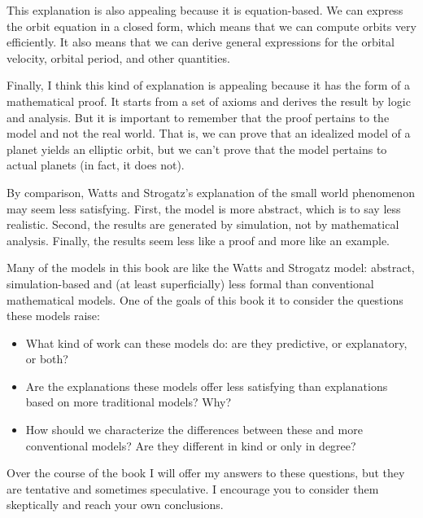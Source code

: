 \documentclass[10pt]{book}
\begin{document}
This explanation is also appealing because it is equation-based.
We can express the orbit equation in a closed form, which means
that we can compute orbits very efficiently.  It also means that
we can derive general expressions for the orbital velocity,
orbital period, and other quantities.

Finally, I think this kind of explanation is appealing because
it has the form of a mathematical proof.  It starts from a
set of axioms and derives the result by logic and analysis.
But it is important to remember that the proof pertains to the
model and not the real world.  That is, we can prove that
an idealized model of a planet yields an elliptic orbit, but
we can't prove that the model pertains to actual planets (in
fact, it does not).

By comparison, Watts and Strogatz's explanation of the small
world phenomenon may seem less satisfying.  First, the model
is more abstract, which is to say less realistic.  Second,
the results are generated by simulation, not by mathematical
analysis.  Finally, the results seem less like a proof and
more like an example.

Many of the models in this book are like the Watts and
Strogatz model: abstract, simulation-based and (at least
superficially) less formal than conventional mathematical 
models.  One of the goals of this book it to consider the
questions these models raise:

\begin{itemize}

\item What kind of work can these models do: are they predictive, or
  explanatory, or both?

\item Are the explanations these models offer less satisfying than
  explanations based on more traditional models?  Why?

\item How should we characterize the differences between these and
  more conventional models?  Are they different in kind or only in
  degree?

\end{itemize}

Over the course of the book I will offer my answers
to these questions, but they are tentative and sometimes
speculative.  I encourage you to consider them skeptically
and reach your own conclusions.
\end{document}
